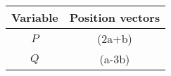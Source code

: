 \begin{tabular}[12pt]{ |c| c|}
    \hline
    \textbf{Variable} & \textbf{Position vectors}\\ 
    \hline
    $P$ & (2a+b)\\
    \hline
    $Q$ & (a-3b)\\
    \hline
    \end{tabular}